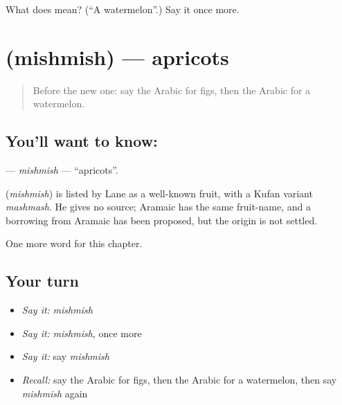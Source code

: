 \begin{tcolorbox}[breakable,colback=teal!4,colframe=teal!35!black,title={Before you move on}]
What does  mean? (\textquotedblleft{}A watermelon\textquotedblright{}.) Say it once more.
\end{tcolorbox}
\section[\texorpdfstring{\ar{مشمش} (mishmish)}{مشمش (mishmish)}]{ (mishmish) — apricots}

\label{lesson:AR-C130-mishmish}



\begin{quote}
Before the new one: say the Arabic for figs, then the Arabic for a watermelon.
\end{quote}

\subsection*{You'll want to know: }
\textbf{} — \emph{mishmish} — \textquotedblleft{}apricots\textquotedblright{}.

\begin{cousinweb}
\textbf{} (\emph{mishmish}) is listed by Lane as a well-known fruit, with a Kufan variant \emph{mashmash}. He gives no source; Aramaic has the same fruit-name, and a borrowing from Aramaic has been proposed, but the origin is not settled.
\end{cousinweb}

\begin{grammarlens}[title={What you've built}]
One more word for this chapter.
\end{grammarlens}

\subsection*{Your turn}
\begin{itemize}
\raggedright
  \item \emph{Say it:} \emph{mishmish}
  \item \emph{Say it:} \emph{mishmish}, once more
  \item \emph{Say it:} say \emph{mishmish}
  \item \emph{Recall:} say the Arabic for figs, then the Arabic for a watermelon, then say \emph{mishmish} again
\end{itemize}

